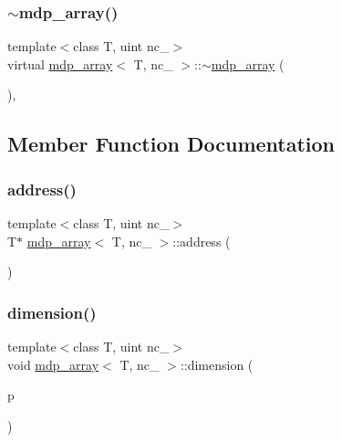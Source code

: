 \subsubsection{\texorpdfstring{$\sim$mdp\+\_\+array()}{~mdp\_array()}}
{\footnotesize\ttfamily template$<$class T, uint nc\+\_\+$>$ \\
virtual \hyperlink{classmdp__array}{mdp\+\_\+array}$<$ T, nc\+\_\+ $>$\+::$\sim$\hyperlink{classmdp__array}{mdp\+\_\+array} (\begin{DoxyParamCaption}{ }\end{DoxyParamCaption})\hspace{0.3cm}{\ttfamily [inline]}, {\ttfamily [virtual]}}



\subsection{Member Function Documentation}
\mbox{\label{classmdp__array_a9b5419e65691954be0a3b6598a47366a}} 
\subsubsection{\texorpdfstring{address()}{address()}}
{\footnotesize\ttfamily template$<$class T, uint nc\+\_\+$>$ \\
T$\ast$ \hyperlink{classmdp__array}{mdp\+\_\+array}$<$ T, nc\+\_\+ $>$\+::address (\begin{DoxyParamCaption}{ }\end{DoxyParamCaption})\hspace{0.3cm}{\ttfamily [inline]}}

\mbox{\label{classmdp__array_a6a3d01021b01c27ea0a0cf43dd442ad5}} 
\subsubsection{\texorpdfstring{dimension()}{dimension()}\hspace{0.1cm}{\footnotesize\ttfamily [1/2]}}
{\footnotesize\ttfamily template$<$class T, uint nc\+\_\+$>$ \\
void \hyperlink{classmdp__array}{mdp\+\_\+array}$<$ T, nc\+\_\+ $>$\+::dimension (\begin{DoxyParamCaption}\item[{const \hyperlink{mdp__global__vars_8h_a91ad9478d81a7aaf2593e8d9c3d06a14}{uint} $\ast$}]{p }\end{DoxyParamCaption})\hspace{0.3cm}{\ttfamily [inline]}}

